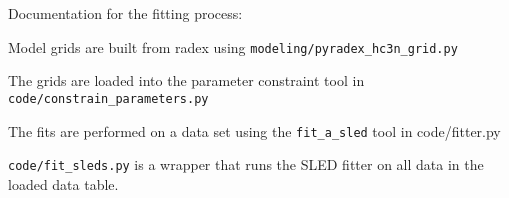 Documentation for the fitting process:

Model grids are built from radex using \texttt{modeling/pyradex\_hc3n\_grid.py}

The grids are loaded into the parameter constraint tool in \texttt{code/constrain_parameters.py}

The fits are performed on a data set using the \texttt{fit\_a\_sled} tool in code/fitter.py

\texttt{code/fit\_sleds.py} is a wrapper that runs the SLED fitter on all data in the loaded data table.